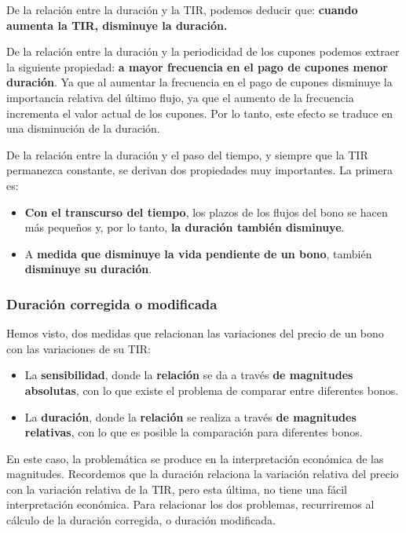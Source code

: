 \documentclass[
  letterpaper,
  DIV=11,
  numbers=noendperiod]{scrartcl}
\begin{document}
De la relación entre la duración y la TIR, podemos deducir que:
\textbf{cuando aumenta la TIR, disminuye la duración.}

De la relación entre la duración y la periodicidad de los cupones
podemos extraer la siguiente propiedad: \textbf{a mayor frecuencia en el
pago de cupones menor duración}. Ya que al aumentar la frecuencia en el
pago de cupones disminuye la importancia relativa del último flujo, ya
que el aumento de la frecuencia incrementa el valor actual de los
cupones. Por lo tanto, este efecto se traduce en una disminución de la
duración.

De la relación entre la duración y el paso del tiempo, y siempre que la
TIR permanezca constante, se derivan dos propiedades muy importantes. La
primera es:

\begin{itemize}
\item
  \textbf{Con el transcurso del tiempo}, los plazos de los flujos del
  bono se hacen más pequeños y, por lo tanto, \textbf{la duración
  también disminuye}.
\item
  A \textbf{medida que disminuye la vida pendiente de un bono}, también
  \textbf{disminuye su duración}.
\end{itemize}

\hypertarget{duraciuxf3n-corregida-o-modificada}{%
\subsubsection{Duración corregida o
modificada}\label{duraciuxf3n-corregida-o-modificada}}

Hemos visto, dos medidas que relacionan las variaciones del precio de un
bono con las variaciones de su TIR:

\begin{itemize}
\item
  La \textbf{sensibilidad}, donde la \textbf{relación} se da a través
  \textbf{de magnitudes} \textbf{absolutas}, con lo que existe el
  problema de comparar entre diferentes bonos.
\item
  La \textbf{duración}, donde la \textbf{relación} se realiza a través
  \textbf{de magnitudes relativas}, con lo que es posible la comparación
  para diferentes bonos.
\end{itemize}

En este caso, la problemática se produce en la interpretación económica
de las magnitudes. Recordemos que la duración relaciona la variación
relativa del precio con la variación relativa de la TIR, pero esta
última, no tiene una fácil interpretación económica. Para relacionar los
dos problemas, recurriremos al cálculo de la duración corregida, o
duración modificada.
\end{document}
